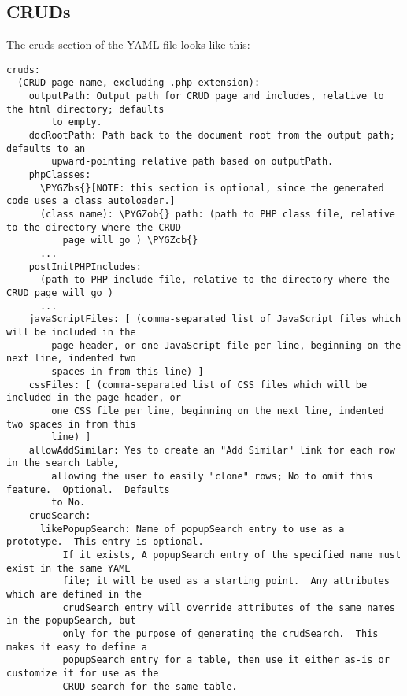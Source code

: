 \documentclass[letterpaper,10pt,english]{sphinxmanual}
\def\PYGZbs{\char`\\}
\def\PYGZob{\char`\{}
\def\PYGZcb{\char`\}}
\begin{document}
\subsection{CRUDs}
\label{jaxFrameworkGuide:cruds}
The cruds section of the YAML file looks like this:

\begin{Verbatim}[commandchars=\\\{\}]
cruds:
  (CRUD page name, excluding .php extension):
    outputPath: Output path for CRUD page and includes, relative to the html directory; defaults
        to empty.
    docRootPath: Path back to the document root from the output path; defaults to an
        upward-pointing relative path based on outputPath.
    phpClasses:
      \PYGZbs{}[NOTE: this section is optional, since the generated code uses a class autoloader.]
      (class name): \PYGZob{} path: (path to PHP class file, relative to the directory where the CRUD
          page will go ) \PYGZcb{}
      ...
    postInitPHPIncludes:
      (path to PHP include file, relative to the directory where the CRUD page will go )
      ...
    javaScriptFiles: [ (comma-separated list of JavaScript files which will be included in the
        page header, or one JavaScript file per line, beginning on the next line, indented two
        spaces in from this line) ]
    cssFiles: [ (comma-separated list of CSS files which will be included in the page header, or
        one CSS file per line, beginning on the next line, indented two spaces in from this
        line) ]
    allowAddSimilar: Yes to create an "Add Similar" link for each row in the search table,
        allowing the user to easily "clone" rows; No to omit this feature.  Optional.  Defaults
        to No.
    crudSearch:
      likePopupSearch: Name of popupSearch entry to use as a prototype.  This entry is optional.
          If it exists, A popupSearch entry of the specified name must exist in the same YAML
          file; it will be used as a starting point.  Any attributes which are defined in the
          crudSearch entry will override attributes of the same names in the popupSearch, but
          only for the purpose of generating the crudSearch.  This makes it easy to define a
          popupSearch entry for a table, then use it either as-is or customize it for use as the
          CRUD search for the same table.


\end{Verbatim}
\end{document}
